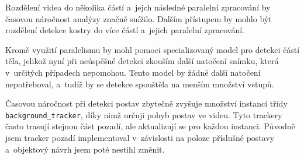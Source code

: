 Rozdělení videa do několika částí a~jejch následné paralelní zpracování by časovou náročnost analýzy značně snížilo. Dalším přístupem by mohlo být rozdělení detekce kostry do více částí a~jejich paralelní zpracování.

Kromě využití paralelismu by mohl pomoci specializovaný model pro detekci částí těla, jelikož nyní při neúspěšné detekci zkouším další natočení snímku, která v~určitých případech nepomohou. Tento model by žádné další natočení nepotřeboval, a~tudíž by se detekce spouštěla na menším množství vstupů.

Časovou náročnost při detekci postav zbytečně zvyšuje množství instancí třídy \texttt{background\_tracker}, díky nimž určuji pohyb postav ve videu. Tyto trackery často trasují stejnou část pozadí, ale aktualizují se pro každou instanci. Původně jsem tracker pozadí implementoval v~závislosti na poloze příslušné postavy a~objektový návrh jsem poté nestihl změnit.



















































